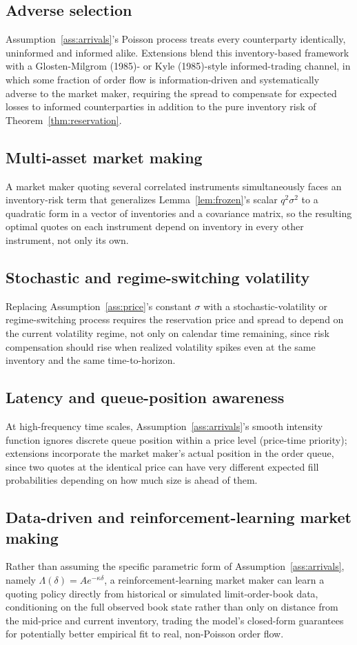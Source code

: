 \documentclass[11pt]{article}
\theoremstyle{remark}
\theoremstyle{definition}
\begin{document}
\subsection{Adverse selection}
Assumption~\ref{ass:arrivals}'s Poisson process treats every counterparty identically, uninformed and informed alike. Extensions blend this inventory-based framework with a Glosten-Milgrom (1985)- or Kyle (1985)-style informed-trading channel, in which some fraction of order flow is information-driven and systematically adverse to the market maker, requiring the spread to compensate for expected losses to informed counterparties in addition to the pure inventory risk of Theorem~\ref{thm:reservation}.

\subsection{Multi-asset market making}
A market maker quoting several correlated instruments simultaneously faces an inventory-risk term that generalizes Lemma~\ref{lem:frozen}'s scalar $q^2\sigma^2$ to a quadratic form in a vector of inventories and a covariance matrix, so the resulting optimal quotes on each instrument depend on inventory in every other instrument, not only its own.

\subsection{Stochastic and regime-switching volatility}
Replacing Assumption~\ref{ass:price}'s constant $\sigma$ with a stochastic-volatility or regime-switching process requires the reservation price and spread to depend on the current volatility regime, not only on calendar time remaining, since risk compensation should rise when realized volatility spikes even at the same inventory and the same time-to-horizon.

\subsection{Latency and queue-position awareness}
At high-frequency time scales, Assumption~\ref{ass:arrivals}'s smooth intensity function ignores discrete queue position within a price level (price-time priority); extensions incorporate the market maker's actual position in the order queue, since two quotes at the identical price can have very different expected fill probabilities depending on how much size is ahead of them.

\subsection{Data-driven and reinforcement-learning market making}
Rather than assuming the specific parametric form of Assumption~\ref{ass:arrivals}, namely $\Lambda(\delta)=Ae^{-\kappa\delta}$, a reinforcement-learning market maker can learn a quoting policy directly from historical or simulated limit-order-book data, conditioning on the full observed book state rather than only on distance from the mid-price and current inventory, trading the model's closed-form guarantees for potentially better empirical fit to real, non-Poisson order flow.
\end{document}

